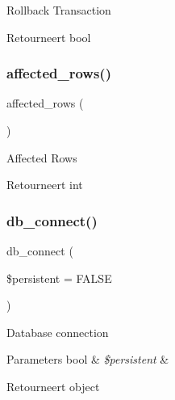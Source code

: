 Rollback Transaction

\begin{DoxyReturn}{Retourneert}
bool 
\end{DoxyReturn}
\mbox{\label{class_c_i___d_b__mysqli__driver_a77248aaad33eb132c04cc4aa3f4bc8cb}} 
\subsubsection{\texorpdfstring{affected\_rows()}{affected\_rows()}}
{\footnotesize\ttfamily affected\+\_\+rows (\begin{DoxyParamCaption}{ }\end{DoxyParamCaption})}

Affected Rows

\begin{DoxyReturn}{Retourneert}
int 
\end{DoxyReturn}
\mbox{\label{class_c_i___d_b__mysqli__driver_a52bf595e79e96cc0a7c907a9b45aeb4d}} 
\subsubsection{\texorpdfstring{db\_connect()}{db\_connect()}}
{\footnotesize\ttfamily db\+\_\+connect (\begin{DoxyParamCaption}\item[{}]{\$persistent = {\ttfamily FALSE} }\end{DoxyParamCaption})}

Database connection


\begin{DoxyParams}[1]{Parameters}
bool & {\em \$persistent} & \\
\hline
\end{DoxyParams}
\begin{DoxyReturn}{Retourneert}
object 
\end{DoxyReturn}
\mbox{\label{class_c_i___d_b__mysqli__driver_a18ae9c21870b30b45337c5e3626190cc}} 
